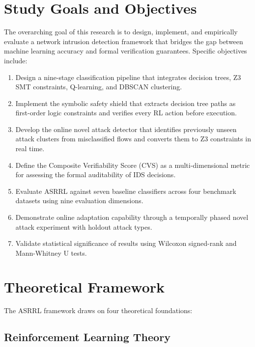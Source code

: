\documentclass[12pt, letterpaper, oneside]{report}
\newcommand{\ASRRL}{\textsc{ASRRL}}
\begin{document}
\section{Study Goals and Objectives}
\label{sec:study_goals}

The overarching goal of this research is to design, implement, and empirically evaluate a network intrusion detection framework that bridges the gap between machine learning accuracy and formal verification guarantees. Specific objectives include:

\begin{enumerate}[label=\textbf{O\arabic*.}]
    \item Design a nine-stage classification pipeline that integrates decision trees, Z3 SMT constraints, Q-learning, and DBSCAN clustering.
    \item Implement the symbolic safety shield that extracts decision tree paths as first-order logic constraints and verifies every RL action before execution.
    \item Develop the online novel attack detector that identifies previously unseen attack clusters from misclassified flows and converts them to Z3 constraints in real time.
    \item Define the Composite Verifiability Score (CVS) as a multi-dimensional metric for assessing the formal auditability of IDS decisions.
    \item Evaluate \ASRRL{} against seven baseline classifiers across four benchmark datasets using nine evaluation dimensions.
    \item Demonstrate online adaptation capability through a temporally phased novel attack experiment with holdout attack types.
    \item Validate statistical significance of results using Wilcoxon signed-rank and Mann-Whitney U tests.
\end{enumerate}


\section{Theoretical Framework}
\label{sec:theoretical_framework}

The \ASRRL{} framework draws on four theoretical foundations:

\subsection{Reinforcement Learning Theory}
\end{document}
